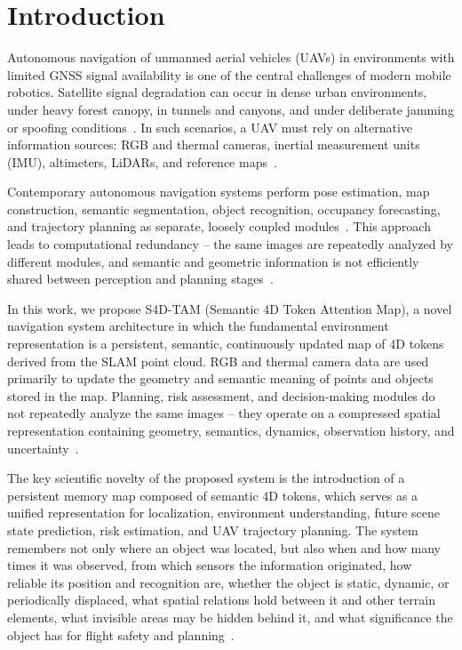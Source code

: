 \section{Introduction}
\label{sec:introduction}

Autonomous navigation of unmanned aerial vehicles (UAVs) in environments with limited GNSS signal availability is one of the central challenges of modern mobile robotics. Satellite signal degradation can occur in dense urban environments, under heavy forest canopy, in tunnels and canyons, and under deliberate jamming or spoofing conditions~\cite{yue2025airground, radwan2024uav, delmerico2018benchmark, qin2018vinsmono}. In such scenarios, a UAV must rely on alternative information sources: RGB and thermal cameras, inertial measurement units (IMU), altimeters, LiDARs, and reference maps~\cite{nieuwenhuisen2015autonomous, nieuwenhuisen2016autonomous, yue2024semantic, hu2025review}.

Contemporary autonomous navigation systems perform pose estimation, map construction, semantic segmentation, object recognition, occupancy forecasting, and trajectory planning as separate, loosely coupled modules~\cite{feng2025survey, placed2022survey}. This approach leads to computational redundancy -- the same images are repeatedly analyzed by different modules, and semantic and geometric information is not efficiently shared between perception and planning stages~\cite{rosen2024scene, ding2025survey}.

In this work, we propose S4D-TAM (Semantic 4D Token Attention Map), a novel navigation system architecture in which the fundamental environment representation is a persistent, semantic, continuously updated map of 4D tokens derived from the SLAM point cloud. RGB and thermal camera data are used primarily to update the geometry and semantic meaning of points and objects stored in the map. Planning, risk assessment, and decision-making modules do not repeatedly analyze the same images -- they operate on a compressed spatial representation containing geometry, semantics, dynamics, observation history, and uncertainty~\cite{pomianek2026s4dtam}.

The key scientific novelty of the proposed system is the introduction of a persistent memory map composed of semantic 4D tokens, which serves as a unified representation for localization, environment understanding, future scene state prediction, risk estimation, and UAV trajectory planning. The system remembers not only where an object was located, but also when and how many times it was observed, from which sensors the information originated, how reliable its position and recognition are, whether the object is static, dynamic, or periodically displaced, what spatial relations hold between it and other terrain elements, what invisible areas may be hidden behind it, and what significance the object has for flight safety and planning~\cite{pomianek2026s4dtam}.

